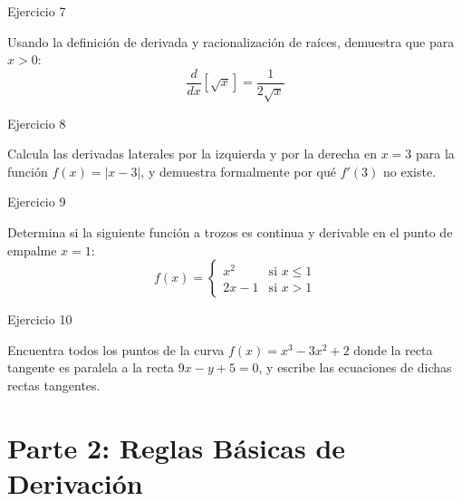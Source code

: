 \documentclass[aspectratio=169]{beamer}
\begin{document}
\begin{frame}{Ejercicio 7}
  \begin{mwejercicio}
    Usando la definición de derivada y racionalización de raíces, demuestra que para $x > 0$:
    $$\frac{d}{dx}[\sqrt{x}] = \frac{1}{2\sqrt{x}}$$
  \end{mwejercicio}
  \vspace{3.5cm}
\end{frame}
\begin{frame}{Ejercicio 8}
  \begin{mwejercicio}
    Calcula las derivadas laterales por la izquierda y por la derecha en $x = 3$ para la función $f(x) = |x - 3|$, y demuestra formalmente por qué $f'(3)$ no existe.
  \end{mwejercicio}
  \vspace{3.5cm}
\end{frame}
\begin{frame}{Ejercicio 9}
  \begin{mwejercicio}
    Determina si la siguiente función a trozos es continua y derivable en el punto de empalme $x = 1$:
    $$f(x) = \begin{cases} x^2 & \text{si } x \le 1 \\ 2x - 1 & \text{si } x > 1 \end{cases}$$
  \end{mwejercicio}
  \vspace{3.5cm}
\end{frame}
\begin{frame}{Ejercicio 10}
  \begin{mwejercicio}
    Encuentra todos los puntos de la curva $f(x) = x^3 - 3x^2 + 2$ donde la recta tangente es paralela a la recta $9x - y + 5 = 0$, y escribe las ecuaciones de dichas rectas tangentes.
  \end{mwejercicio}
  \vspace{3.5cm}
\end{frame}


\section{Parte 2: Reglas Básicas de Derivación}
\end{document}
